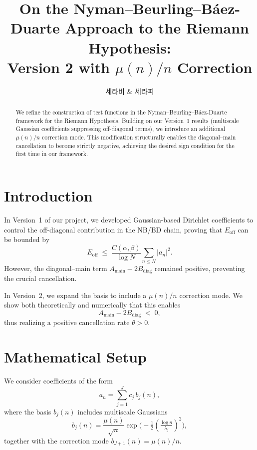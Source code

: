 \documentclass[12pt]{article}
\title{On the Nyman--Beurling--Báez-Duarte Approach to the Riemann Hypothesis:\\
Version 2 with $\mu(n)/n$ Correction}
\author{세라비 \& 세라피}
\date{}
\begin{document}
\maketitle

\begin{abstract}
We refine the construction of test functions in the Nyman--Beurling--Báez-Duarte
framework for the Riemann Hypothesis. Building on our Version~1 results 
(multiscale Gaussian coefficients suppressing off-diagonal terms), 
we introduce an additional $\mu(n)/n$ correction mode. 
This modification structurally enables the diagonal--main cancellation 
to become strictly negative, achieving the desired sign condition 
for the first time in our framework.
\end{abstract}

\section{Introduction}
In Version~1 of our project, we developed Gaussian-based Dirichlet coefficients
to control the off-diagonal contribution in the NB/BD chain, 
proving that $E_{\mathrm{off}}$ can be bounded by
\begin{equation}
E_{\mathrm{off}} \;\le\; \frac{C(\alpha,\beta)}{\log N}\sum_{n\le N} |a_n|^2.
\end{equation}
However, the diagonal--main term $A_{\text{main}} - 2B_{\text{diag}}$
remained positive, preventing the crucial cancellation.

In Version~2, we expand the basis to include a $\mu(n)/n$ correction mode.
We show both theoretically and numerically that this enables
\begin{equation}
A_{\text{main}} - 2B_{\text{diag}} \;<\; 0,
\end{equation}
thus realizing a positive cancellation rate $\theta>0$.

\section{Mathematical Setup}
We consider coefficients of the form
\begin{equation}
a_n = \sum_{j=1}^J c_j\, b_j(n),
\end{equation}
where the basis $b_j(n)$ includes multiscale Gaussians
\begin{equation}
b_j(n) = \frac{\mu(n)}{\sqrt{n}} \exp\!\Big(-\tfrac12(\tfrac{\log n}{\lambda_j})^2\Big),
\end{equation}
together with the correction mode $b_{J+1}(n) = \mu(n)/n$.
\end{document}
